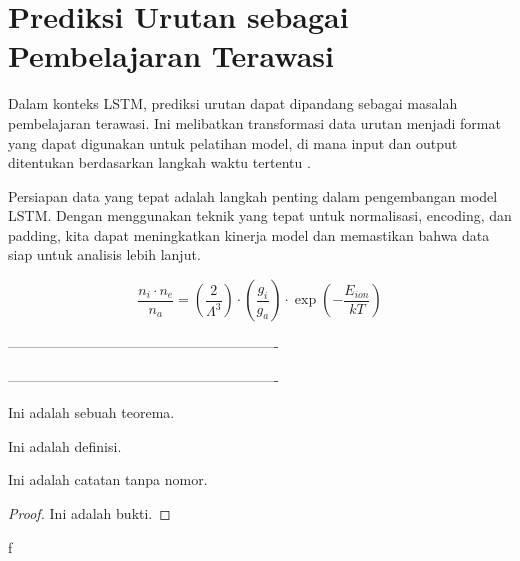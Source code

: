 \section{Prediksi Urutan sebagai Pembelajaran Terawasi}
\par Dalam konteks LSTM, prediksi urutan dapat dipandang sebagai masalah pembelajaran terawasi. Ini melibatkan transformasi data urutan menjadi format yang dapat digunakan untuk pelatihan model, di mana input dan output ditentukan berdasarkan langkah waktu tertentu \citep{brownlee2017}.


\par Persiapan data yang tepat adalah langkah penting dalam pengembangan model LSTM. Dengan menggunakan teknik yang tepat untuk normalisasi, encoding, dan padding, kita dapat meningkatkan kinerja model dan memastikan bahwa data siap untuk analisis lebih lanjut.

\begin{equation}
    \frac{n_i \cdot n_e}{n_a} = \left( \frac{2}{\Lambda^3} \right) \cdot \left( \frac{g_i}{g_a} \right) \cdot \exp \left( -\frac{E_{ion}}{kT} \right)
    \label{eq:rate}
\end{equation}


----------------------------------------------------------%

----------------------------------------------------------




\begin{theorem}
Ini adalah sebuah teorema.
\end{theorem}

\begin{definition}
Ini adalah definisi.
\end{definition}

\begin{remark}
Ini adalah catatan tanpa nomor.
\end{remark} 

\begin{proof}
Ini adalah bukti.
\end{proof}
 \begin{example}
        f
 \end{example}


